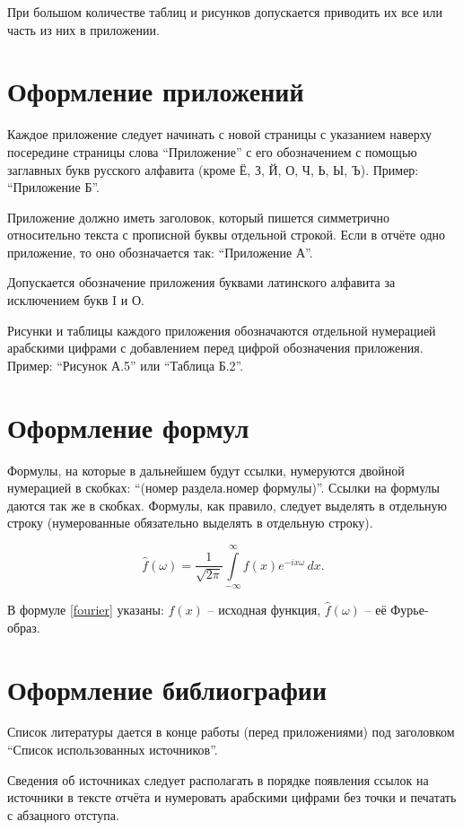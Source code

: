 \documentclass[utf8,12pt, coursreport]{G7-32}
\begin{document}
При большом количестве таблиц и рисунков допускается приводить их все или часть из них в приложении.

\section{Оформление приложений}

Каждое приложение следует начинать с новой страницы с указанием наверху посередине страницы слова ``Приложение'' с его обозначением с помощью заглавных букв русского алфавита (кроме Ё, З, Й, О, Ч, Ь, Ы, Ъ). Пример: ``Приложение Б''.

Приложение должно иметь заголовок, который пишется симметрично относительно текста с прописной буквы отдельной строкой. Если в отчёте одно приложение, то оно обозначается так: ``Приложение А''.

Допускается обозначение приложения буквами латинского алфавита за исключением букв I и О.

Рисунки и таблицы каждого приложения обозначаются отдельной нумерацией арабскими цифрами с добавлением перед цифрой обозначения приложения. Пример: ``Рисунок А.5'' или ``Таблица Б.2''.

\section{Оформление формул}

Формулы, на которые в дальнейшем будут ссылки, нумеруются двойной нумерацией в скобках: ``(номер раздела.номер формулы)''. Ссылки на формулы даются так же в скобках. Формулы, как правило, следует выделять в отдельную строку (нумерованные обязательно выделять в отдельную строку).

\begin{equation}\label{fourier}
\hat{f}(\omega)=\frac{1}{\sqrt{2\pi}}\int\limits_{-\infty}^{\infty}f(x)e^{-ix\omega}\,dx.
\end{equation}

В формуле \eqref{fourier} указаны: $f(x)$ -- исходная функция, $\hat{f}(\omega)$ -- её Фурье-образ.

\section{Оформление библиографии}

Список литературы дается в конце работы (перед приложениями) под заголовком ``Список использованных источников''.

Сведения об источниках следует располагать в порядке появления ссылок на источники в тексте отчёта и нумеровать арабскими цифрами без точки и печатать с абзацного отступа.
\end{document}
